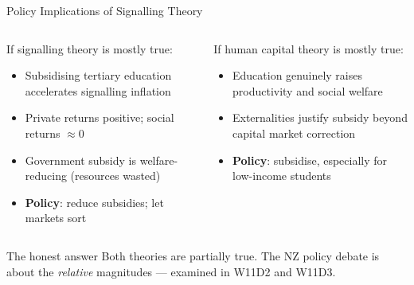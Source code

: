 \documentclass[aspectratio=169, 12pt]{beamer}
\begin{document}
\begin{frame}{Policy Implications of Signalling Theory}
  \begin{columns}
      \begin{alertblock}{If signalling theory is mostly true:}
        \footnotesize
        \begin{itemize}
          \item Subsidising tertiary education accelerates signalling inflation
          \item Private returns positive; social returns $\approx 0$
          \item Government subsidy is welfare-reducing (resources wasted)
          \item \textbf{Policy}: reduce subsidies; let markets sort
        \end{itemize}
      \end{alertblock}
      \begin{block}{If human capital theory is mostly true:}
        \footnotesize
        \begin{itemize}
          \item Education genuinely raises productivity and social welfare
          \item Externalities justify subsidy beyond capital market correction
          \item \textbf{Policy}: subsidise, especially for low-income students
        \end{itemize}
      \end{block}
  \end{columns}
  \vspace{0.15em}
  \begin{exampleblock}{The honest answer}
    \small Both theories are partially true. The NZ policy debate is about the \emph{relative}
    magnitudes --- examined in W11D2 and W11D3.
  \end{exampleblock}
\end{frame}

\end{document}
